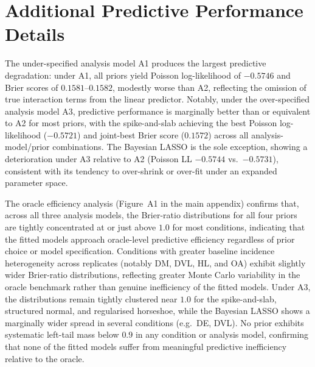 \documentclass[12pt]{article}
\begin{document}
\section{Additional Predictive Performance Details}
\label{sec:supp_pred}

The under-specified analysis model A1 produces the largest predictive
degradation: under A1, all priors yield Poisson log-likelihood of $-0.5746$
and Brier scores of $0.1581$--$0.1582$, modestly worse than A2, reflecting the
omission of true interaction terms from the linear predictor. Notably, under
the over-specified analysis model A3, predictive performance is marginally
better than or equivalent to A2 for most priors, with the spike-and-slab
achieving the best Poisson log-likelihood ($-0.5721$) and joint-best Brier
score ($0.1572$) across all analysis-model/prior combinations. The Bayesian
LASSO is the sole exception, showing a deterioration under A3 relative to A2
(Poisson LL $-0.5744$ vs.\ $-0.5731$), consistent with its tendency to
over-shrink or over-fit under an expanded parameter space.

The oracle efficiency analysis (Figure~A1 in the main appendix) confirms
that, across all three analysis models, the Brier-ratio distributions for all
four priors are tightly concentrated at or just above $1.0$ for most
conditions, indicating that the fitted models approach oracle-level predictive
efficiency regardless of prior choice or model specification. Conditions with
greater baseline incidence heterogeneity across replicates (notably DM, DVL,
HL, and OA) exhibit slightly wider Brier-ratio distributions, reflecting
greater Monte Carlo variability in the oracle benchmark rather than genuine
inefficiency of the fitted models. Under A3, the distributions remain tightly
clustered near $1.0$ for the spike-and-slab, structured normal, and
regularised horseshoe, while the Bayesian LASSO shows a marginally wider
spread in several conditions (e.g.\ DE, DVL). No prior exhibits systematic
left-tail mass below $0.9$ in any condition or analysis model, confirming
that none of the fitted models suffer from meaningful predictive inefficiency
relative to the oracle.



\end{document}

